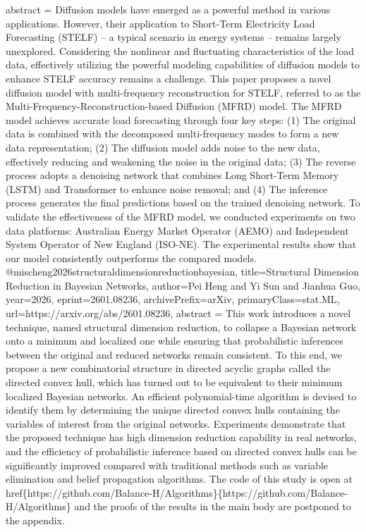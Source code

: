 {      abstract = {Diffusion models have emerged as a powerful method in various applications. However, their application to Short-Term Electricity Load Forecasting (STELF) -- a typical scenario in energy systems -- remains largely unexplored. Considering the nonlinear and fluctuating characteristics of the load data, effectively utilizing the powerful modeling capabilities of diffusion models to enhance STELF accuracy remains a challenge. This paper proposes a novel diffusion model with multi-frequency reconstruction for STELF, referred to as the Multi-Frequency-Reconstruction-based Diffusion (MFRD) model. The MFRD model achieves accurate load forecasting through four key steps: (1) The original data is combined with the decomposed multi-frequency modes to form a new data representation; (2) The diffusion model adds noise to the new data, effectively reducing and weakening the noise in the original data; (3) The reverse process adopts a denoising network that combines Long Short-Term Memory (LSTM) and Transformer to enhance noise removal; and (4) The inference process generates the final predictions based on the trained denoising network. To validate the effectiveness of the MFRD model, we conducted experiments on two data platforms: Australian Energy Market Operator (AEMO) and Independent System Operator of New England (ISO-NE). The experimental results show that our model consistently outperforms the compared models.}
}@misc{heng2026structuraldimensionreductionbayesian,
      title={Structural Dimension Reduction in Bayesian Networks}, 
      author={Pei Heng and Yi Sun and Jianhua Guo},
      year={2026},
      eprint={2601.08236},
      archivePrefix={arXiv},
      primaryClass={stat.ML},
      url={https://arxiv.org/abs/2601.08236},
      abstract = {This work introduces a novel technique, named structural dimension reduction, to collapse a Bayesian network onto a minimum and localized one while ensuring that probabilistic inferences between the original and reduced networks remain consistent. To this end, we propose a new combinatorial structure in directed acyclic graphs called the directed convex hull, which has turned out to be equivalent to their minimum localized Bayesian networks. An efficient polynomial-time algorithm is devised to identify them by determining the unique directed convex hulls containing the variables of interest from the original networks. Experiments demonstrate that the proposed technique has high dimension reduction capability in real networks, and the efficiency of probabilistic inference based on directed convex hulls can be significantly improved compared with traditional methods such as variable elimination and belief propagation algorithms. The code of this study is open at \\href\{https://github.com/Balance-H/Algorithms\}\{https://github.com/Balance-H/Algorithms\} and the proofs of the results in the main body are postponed to the appendix.}
}
